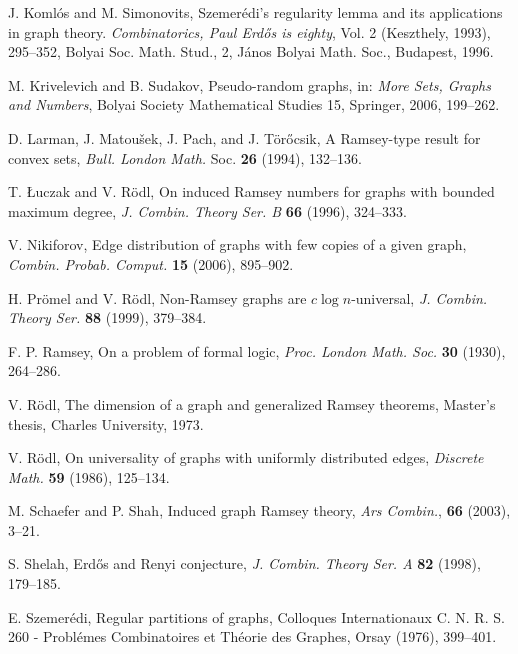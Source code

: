 \documentclass[11pt]{article}
\begin{document}
\begin{thebibliography}{}

J. Koml\'os and M. Simonovits, Szemer\'edi's regularity lemma and
its applications in graph theory. {\it Combinatorics, Paul Erd\H{o}s
is eighty}, Vol. 2 (Keszthely, 1993), 295--352, Bolyai Soc. Math.
Stud., 2, J\'anos Bolyai Math. Soc., Budapest, 1996.

M. Krivelevich and B. Sudakov, Pseudo-random graphs, in: {\it More
Sets, Graphs and Numbers}, Bolyai Society Mathematical Studies 15,
Springer, 2006, 199--262.

D. Larman, J.  Matou\v sek, J. Pach, and J. T\"or\H{o}csik,  A
Ramsey-type result for convex sets, {\it Bull. London Math.} Soc.
{\bf 26} (1994), 132--136.

T. \L uczak and V. R\"odl, On induced Ramsey numbers for graphs with
bounded maximum degree, {\it J. Combin. Theory Ser. B} {\bf 66}
(1996), 324--333.


V. Nikiforov, Edge distribution of graphs with few copies of a given
graph, {\it Combin. Probab. Comput.} {\bf 15}
(2006), 895--902.


 H. Pr\"omel and V. R\"odl, Non-Ramsey graphs are $c\log n$-universal,
{\em J. Combin. Theory Ser.} {\bf 88} (1999), 379--384.

F. P. Ramsey, On a problem of formal logic, {\it Proc. London Math.
Soc.} {\bf 30} (1930), 264--286.


V. R\"odl, The dimension of a graph and generalized Ramsey theorems, Master's thesis,
Charles University, 1973.

V. R\"odl, On universality of graphs with uniformly distributed
edges, {\it Discrete Math.} {\bf 59} (1986), 125--134.

M. Schaefer and P. Shah, Induced graph Ramsey theory, {\it Ars
Combin.}, {\bf 66} (2003), 3--21.

S. Shelah, Erd\H{o}s and Renyi conjecture, {\it J. Combin. Theory
Ser. A} {\bf 82} (1998), 179--185.


E. Szemer\'edi, Regular partitions of graphs, Colloques
Internationaux C. N. R. S. 260 - Probl\'emes Combinatoires et
Th\'eorie des Graphes, Orsay (1976), 399--401.

\end{thebibliography}
\end{document}
